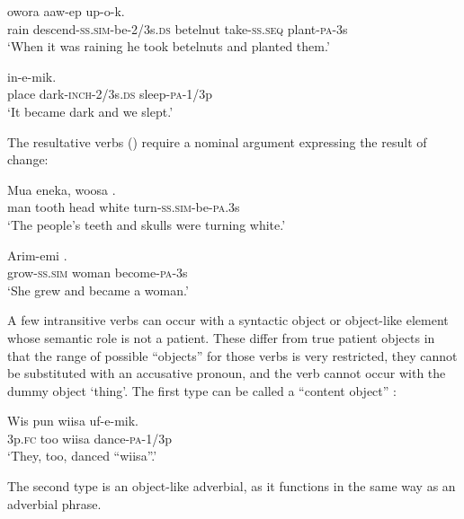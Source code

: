\ea%
\label{ex:5:x1022}
\gll {}   owora  aaw-ep  up-o-k. \\
     rain  descend-\textsc{ss}.\textsc{sim}-be-2/3s.\textsc{ds}  betelnut  take-\textsc{ss}.\textsc{seq}  plant-\textsc{pa}-3s \\
\glt `When it was raining he took betelnuts and planted them.'
\z

\ea%
\label{ex:5:x1021}
\gll {}   in-e-mik. \\
     place  dark-\textsc{inch}-2/3s.\textsc{ds}  sleep-\textsc{pa}-1/3p \\
\glt `It became dark and we slept.'
\z

The resultative verbs () require a nominal argument expressing the result of change: 

\ea%
\label{ex:5:x963}
\gll Mua  eneka,  woosa   . \\
     man  tooth  head  white  turn-\textsc{ss}.\textsc{sim}-be-\textsc{pa}.3s \\
\glt `The people's teeth and skulls were turning white.'
\z

\ea%
\label{ex:5:x966}
\gll Arim-emi   . \\
     grow-\textsc{ss}.\textsc{sim}  woman  become-\textsc{pa}-3s \\
\glt `She grew and became a woman.'
\z

A few intransitive verbs can occur with a syntactic object or object-like element whose semantic role is not a patient. These differ from true patient objects in that the range of possible ``objects'' for those verbs is very restricted, they cannot be substituted with an accusative pronoun, and the verb cannot occur with the dummy object  `thing'. The first type can be called a ``content object'' \citep[179]{HakulinenEtAl1979}%
: 

\ea%
\label{ex:5:x308}
\gll Wis  pun  wiisa  uf-e-mik. \\
     3p.\textsc{fc}  too  wiisa  dance-\textsc{pa}-1/3p \\
\glt `They, too, danced ``wiisa''.'
\z

The second type is an object-like adverbial, as it functions in the same way as an adverbial phrase.


